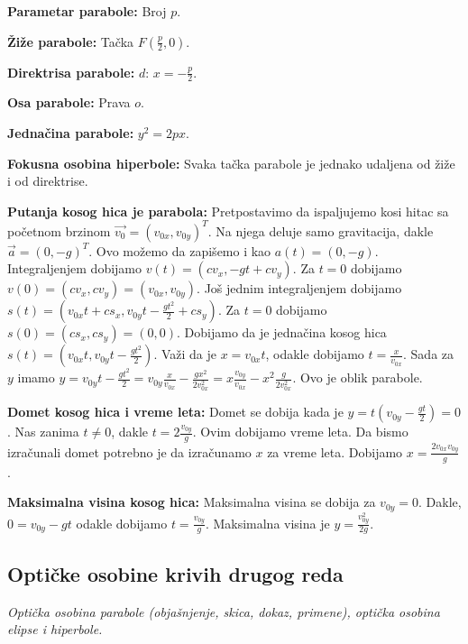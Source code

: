 \documentclass[12pt]{article}
\newcommand{\vek}[1]{\overrightarrow{#1}}
\begin{document}
\textbf{Parametar parabole:} Broj $p$.
\par

\textbf{Žiže parabole:} Tačka $F(\frac{p}{2},0)$.
\par

\textbf{Direktrisa parabole:} $d$: $x=-\frac{p}{2}$.
\par

\textbf{Osa parabole:} Prava $o$.
\par

\textbf{Jednačina parabole:} $y^2=2px$.
\par

\textbf{Fokusna osobina hiperbole:} Svaka tačka parabole je jednako udaljena od
žiže i od direktrise.
\par

\textbf{Putanja kosog hica je parabola:} Pretpostavimo da ispaljujemo kosi
hitac sa početnom brzinom $\vek{v_0}=(v_{0x},v_{0y})^T$. Na njega deluje samo
gravitacija, dakle $\vek{a}=(0,-g)^T$. Ovo možemo da zapišemo i kao
$a(t)=(0,-g)$. Integraljenjem dobijamo $v(t)=(cv_x,-gt+cv_y)$. Za $t=0$
dobijamo $v(0)=(cv_x,cv_y)=(v_{0x},v_{0y})$. Još jednim integraljenjem dobijamo
$s(t)=(v_{0x}t+cs_x,v_{0y}t-\frac{gt^2}{2}+cs_y)$. Za $t=0$ dobijamo
$s(0)=(cs_x,cs_y)=(0,0)$. Dobijamo da je jednačina kosog hica
$s(t)=(v_{0x}t,v_{0y}t-\frac{gt^2}{2})$. Važi da je $x=v_{0x}t$, odakle
dobijamo $t=\frac{x}{v_{0x}}$. Sada za $y$ imamo $y=v_{0y}t-\frac{gt^2}{2}=
    v_{0y}\frac{x}{v_{0x}}-\frac{gx^2}{2v_{0x}^2}=
    x\frac{v_{0y}}{v_{0x}}-x^2\frac{g}{2v_{0x}^2}$. Ovo je oblik parabole.
\par

\textbf{Domet kosog hica i vreme leta:} Domet se dobija kada je
$y=t(v_{0y}-\frac{gt}{2})=0$. Nas zanima $t\neq0$, dakle $t=2\frac{v_{0y}}{g}$.
Ovim dobijamo vreme leta. Da bismo izračunali domet potrebno je da izračunamo
$x$ za vreme leta. Dobijamo $x=\frac{2v_{0x}v_{0y}}{g}$.
\par

\textbf{Maksimalna visina kosog hica:} Maksimalna visina se dobija za
$v_{0y}=0$. Dakle, $0=v_{0y}-gt$ odakle dobijamo $t=\frac{v_{0y}}{g}$.
Maksimalna visina je $y=\frac{v_{0y}^2}{2g}$.
\par


\subsection{Optičke osobine krivih drugog reda}
\textit{Optička osobina parabole (objašnjenje, skica, dokaz, primene), optička
    osobina elipse i hiperbole.}
\par
\vspace*{1cm}
\end{document}
